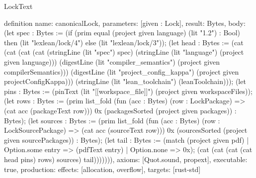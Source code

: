 \begin{lexlean}{LockText}
\begin{semanticmodule}
definition{
  name: canonicalLock,
  parameters: [given : Lock],
  result: Bytes,
  body: (let spec : Bytes := (if (prim equal (project given language) (lit "1.2") : Bool) then (lit "lexlean/lock/4") else (lit "lexlean/lock/3")); (let head : Bytes := (cat (cat (cat (cat (stringLine (lit "spec") spec) (stringLine (lit "language") (project given language))) (digestLine (lit "compiler_semantics") (project given compilerSemantics))) (digestLine (lit "project_config_kappa") (project given projectConfigKappa))) (stringLine (lit "lean_toolchain") (leanToolchain))); (let pins : Bytes := (pinText (lit "[[workspace_file]]") (project given workspaceFiles)); (let rows : Bytes := (prim list_fold (fun (acc : Bytes) (row : LockPackage) => (cat acc (packageText row))) 0x (packagesSorted (project given packages)) : Bytes); (let sources : Bytes := (prim list_fold (fun (acc : Bytes) (row : LockSourcePackage) => (cat acc (sourceText row))) 0x (sourcesSorted (project given sourcePackages)) : Bytes); (let tail : Bytes := (match (project given pdf)
    | Option.some entry => (pdfText entry)
    | Option.none => 0x); (cat (cat (cat (cat head pins) rows) sources) tail))))))),
  axioms: [Quot.sound, propext],
  executable: true,
  production: {effects: [allocation, overflow], targets: [rust-std]}
}
\end{semanticmodule}
\end{lexlean}
